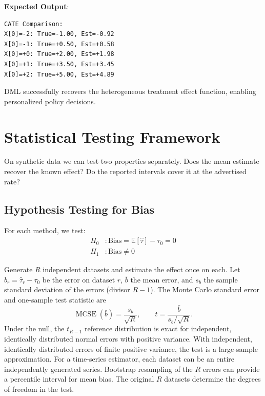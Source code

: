\textbf{Expected Output}:

\begin{verbatim}
CATE Comparison:
X[0]=-2: True=-1.00, Est=-0.92
X[0]=-1: True=+0.50, Est=+0.58
X[0]=+0: True=+2.00, Est=+1.98
X[0]=+1: True=+3.50, Est=+3.45
X[0]=+2: True=+5.00, Est=+4.89
\end{verbatim}

%

DML successfully recovers the heterogeneous treatment effect function, enabling personalized policy decisions.


\section{Statistical Testing Framework}

On synthetic data we can test two properties separately. Does the mean estimate recover the known effect? Do the reported intervals cover it at the advertised rate?

\subsection{Hypothesis Testing for Bias}

For each method, we test:
\begin{align}
H_0&: \text{Bias} = \mathbb{E}[\hat{\tau}] - \tau_0 = 0 \\
H_1&: \text{Bias} \neq 0
\end{align}

Generate $R$ independent datasets and estimate the effect once on each. Let
$b_r=\hat{\tau}_r-\tau_0$ be the error on dataset $r$, $\bar b$ the mean error,
and $s_b$ the sample standard deviation of the errors (divisor $R-1$).
The Monte Carlo standard error and one-sample test statistic are
\[
  \operatorname{MCSE}(\bar b)=\frac{s_b}{\sqrt{R}},
  \qquad t=\frac{\bar b}{s_b/\sqrt{R}}.
\]
Under the null, the $t_{R-1}$ reference distribution is exact for independent,
identically distributed normal errors with positive variance. With independent,
identically distributed errors of finite positive variance, the test is a
large-sample approximation. For a time-series estimator, each dataset can be
an entire independently generated series. Bootstrap resampling of the $R$
errors can provide a percentile interval for mean bias. The original $R$
datasets determine the degrees of freedom in the test.

